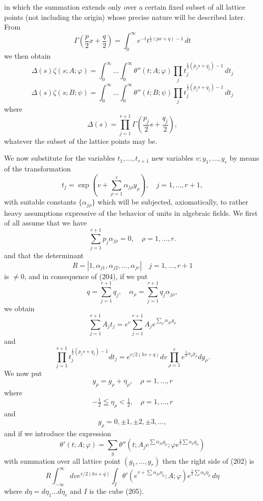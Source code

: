 \documentclass[12pt]{article}
\begin{document}
in which the summation extends only over a certain fixed subset of all lattice points (not including the origin) whose precise nature will be described later. From
\[
\Gamma\left(\frac{p}{2}x + \frac{q}{2}\right) = \int_0^{\infty} e^{-t} t^{\frac{1}{2}(px+q)-1} \, dt
\]
we then obtain
\begin{equation}
\Delta(s)\zeta(s; A; \varphi) = \int_0^{\infty} \dots \int_0^{\infty} \theta''(t; A; \varphi) \prod_j t_j^{\frac{1}{2}(p_j s + q_j)-1} \, dt_j
\tag{202}
\end{equation}
\begin{equation}
\Delta(s)\zeta(s; B; \psi) = \int_0^{\infty} \dots \int_0^{\infty} \theta''(t; B; \psi) \prod_j t_j^{\frac{1}{2}(p_j s + q_j)-1} \, dt_j
\tag{203}
\end{equation}
where
\[
\Delta(s) = \prod_{j=1}^{r+1} \Gamma\left(\frac{p_j}{2}s + \frac{q_j}{2}\right),
\]
whatever the subset of the lattice points may be.

We now substitute for the variables \(t_1, \dots, t_{r+1}\) new variables \(v; y_1, \dots, y_r\) by means of the transformation
\[
t_j = \exp \left( v + \sum_{\rho=1}^r \alpha_{j\rho} y_\rho \right), \quad j = 1, \dots, r + 1,
\]
with suitable constants \(\{\alpha_{j\rho}\}\) which will be subjected, axiomatically, to rather heavy assumptions expressive of the behavior of units in algebraic fields. We first of all assume that we have
\begin{equation}
\sum_{j=1}^{r+1} p_j \alpha_{j\rho} = 0, \quad \rho = 1, \dots, r.
\tag{204}
\end{equation}
and that the determinant
\[
R = |1, \alpha_{j1}, \alpha_{j2}, \dots, \alpha_{jr}| \quad j = 1, \dots, r + 1
\]
is \(\ne 0\), and in consequence of (204), if we put
\[
q = \sum_{j=1}^{r+1} q_j, \quad \alpha_\rho = \sum_{j=1}^{r+1} q_j \alpha_{j\rho},
\]
we obtain
\[
\sum_{j=1}^{r+1} A_j t_j = e^v \sum_{j=1}^{r+1} A_j e^{\sum_\rho \alpha_{j\rho} y_\rho}
\]
and
\[
\prod_{j=1}^{r+1} t_j^{\frac{1}{2}(p_j s + q_j) - 1} dt_j = e^{v/2(ks+q)} dv \prod_{\rho=1}^r e^{\frac{1}{2} \alpha_\rho y_\rho} dy_\rho.
\]
We now put
\[
y_\rho = g_\rho + \eta_\rho, \quad \rho = 1, \dots, r
\]
where
\begin{equation}
-\tfrac{1}{2} \leqq \eta_\rho < \tfrac{1}{2}, \quad \rho = 1, \dots, r
\tag{205}
\end{equation}
and
\[
g_\rho = 0, \pm 1, \pm 2, \pm 3, \dots,
\]
and if we introduce the expression
\[
\theta'(t; A; \varphi) = \sum_g \theta''(t; A_j e^{\sum \alpha_{j\rho} g_\rho}; \varphi e^{\frac{1}{2} \sum \alpha_\rho g_\rho})
\]
with summation over all lattice point \((g_1, \dots, g_r)\) then the right side of (202) is
\begin{equation}
R \int_{-\infty}^{\infty} dv e^{v/2(ks+q)} \int_I \theta'(e^{v+\sum \alpha_{j\rho} \eta_\rho}; A; \varphi) e^{\frac{1}{2} \sum \alpha_\rho \eta_\rho} \, d\eta
\tag{206}
\end{equation}
where \(d\eta = d\eta_1 \dots d\eta_r\) and \(I\) is the cube (205).
\end{document}
